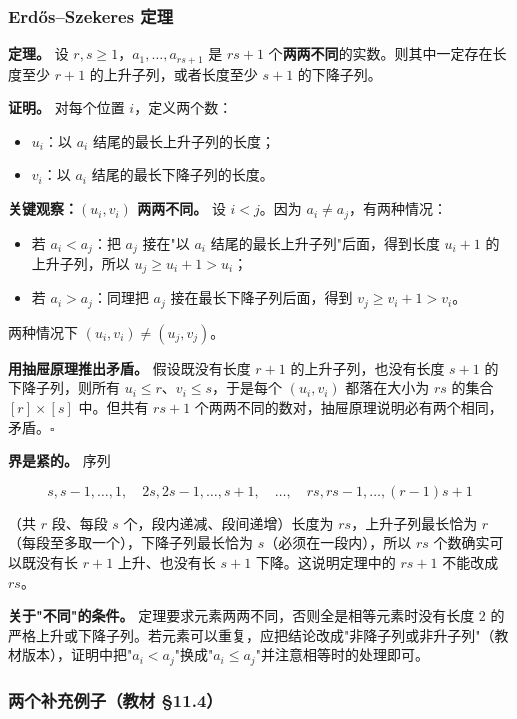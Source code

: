 \subsubsection{Erdős–Szekeres 定理}


\textbf{定理。} 设 $r,s\ge1$，$a_1,\dots,a_{rs+1}$ 是 $rs+1$ 个\textbf{两两不同}的实数。则其中一定存在长度至少 $r+1$ 的上升子列，或者长度至少 $s+1$ 的下降子列。

\textbf{证明。} 对每个位置 $i$，定义两个数：

\begin{itemize}
\item $u_i$：以 $a_i$ 结尾的最长上升子列的长度；
\item $v_i$：以 $a_i$ 结尾的最长下降子列的长度。
\end{itemize}


\textbf{关键观察：$(u_i,v_i)$ 两两不同。} 设 $i<j$。因为 $a_i\ne a_j$，有两种情况：

\begin{itemize}
\item 若 $a_i<a_j$：把 $a_j$ 接在"以 $a_i$ 结尾的最长上升子列"后面，得到长度 $u_i+1$ 的上升子列，所以 $u_j\ge u_i+1>u_i$；
\item 若 $a_i>a_j$：同理把 $a_j$ 接在最长下降子列后面，得到 $v_j\ge v_i+1>v_i$。
\end{itemize}


两种情况下 $(u_i,v_i)\ne(u_j,v_j)$。

\textbf{用抽屉原理推出矛盾。} 假设既没有长度 $r+1$ 的上升子列，也没有长度 $s+1$ 的下降子列，则所有 $u_i\le r$、$v_i\le s$，于是每个 $(u_i,v_i)$ 都落在大小为 $rs$ 的集合 $[r]\times[s]$ 中。但共有 $rs+1$ 个两两不同的数对，抽屉原理说明必有两个相同，矛盾。$\square$

\textbf{界是紧的。} 序列

\[
s,s-1,\dots,1,\quad 2s,2s-1,\dots,s+1,\quad\dots,\quad rs,rs-1,\dots,(r-1)s+1
\]

（共 $r$ 段、每段 $s$ 个，段内递减、段间递增）长度为 $rs$，上升子列最长恰为 $r$（每段至多取一个），下降子列最长恰为 $s$（必须在一段内），所以 $rs$ 个数确实可以既没有长 $r+1$ 上升、也没有长 $s+1$ 下降。这说明定理中的 $rs+1$ 不能改成 $rs$。

\textbf{关于"不同"的条件。} 定理要求元素两两不同，否则全是相等元素时没有长度 $2$ 的严格上升或下降子列。若元素可以重复，应把结论改成"非降子列或非升子列"（教材版本），证明中把"$a_i<a_j$"换成"$a_i\le a_j$"并注意相等时的处理即可。

\subsubsection{两个补充例子（教材 §11.4）}


